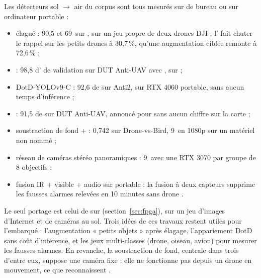 Les détecteurs sol $\rightarrow$ air du corpus sont tous mesurés sur  de bureau ou sur
ordinateur portable :
\begin{itemize}
  \item {} élagué \citep{2021-liu-real-time-small-drones-detection} : 90,5  et
    69\, sur , sur un jeu propre de deux drones DJI  ; l'
    fait chuter le rappel sur les petits drones à 30,7\,\%, qu'une augmentation ciblée
    remonte à 72,6\,\%  ;
  \item {} \citep{2025-du-f-yolov7-fast-robust-real} : 98,8 d' de validation sur
    DUT Anti-UAV avec , sur   ;
  \item DotD-YOLOv9-C \citep{2024-gao-dataset-detection-method-unmanned-aerial} : 92,6 de
     sur Anti2, sur RTX 4060 portable, sans aucun temps d'inférence  ;
  \item {} \citep{2025-yu-yolo-gcof-lightweight-low-altitude} : 91,5 de  sur
    DUT Anti-UAV\med{}, annoncé pour  sans aucun chiffre sur la carte ;
  \item soustraction de fond +  \citep{2020-seidaliyeva-real-time-accurate-drone-detection} :
     0,742 sur Drone-vs-Bird, 9\, en 1080p sur un matériel non nommé  ;
  \item réseau de caméras stéréo panoramiques
    \citep{2023-zheng-detection-localization-tracking-multiple-mavs} : 9\, avec une RTX
    3070 par groupe de 8 objectifs \med ;
  \item fusion IR + visible + audio \citep{arxiv-2007.07396-real-time-drone-detection-tracking}
    sur portable : la fusion à deux capteurs supprime les fausses alarmes relevées en
    10 minutes sans drone .
\end{itemize}
Le seul portage  est celui de \citet{2024-nguyen-fpga-soc-implementation-yolov4-flying}
sur  (section~\ref{sec:fpga}), sur un jeu d'images d'Internet et de caméras au sol.
Trois idées de ces travaux restent utiles pour l'embarqué : l'augmentation « petits
objets » après élagage, l'appariement DotD sans coût d'inférence, et les jeux
multi-classes (drone, oiseau, avion) pour mesurer les fausses alarmes. En revanche, la
soustraction de fond, centrale dans trois d'entre eux, suppose une caméra fixe : elle ne
fonctionne pas depuis un drone en mouvement, ce que reconnaissent
\citet[§2.1]{2020-seidaliyeva-real-time-accurate-drone-detection}.

